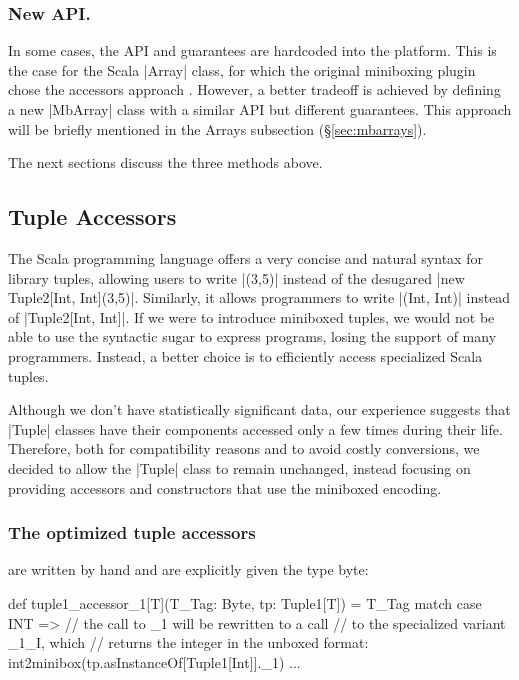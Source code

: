 \vspace{-0.5em}

\subsubsection{New API.} In some cases, the API and guarantees are hardcoded into the platform. This is the case for the Scala |Array| class, for which the original miniboxing plugin chose the accessors approach \cite{miniboxing}. However, a better tradeoff is achieved by defining a new |MbArray| class with a similar API but different guarantees. This approach will be briefly mentioned in the Arrays subsection (\S\ref{sec:mbarrays}).

The next sections discuss the three methods above.

\vspace{-0.5em}

\subsection{Tuple Accessors}
\label{sec:tuples}

\vspace{-0.25em}

The Scala programming language offers a very concise and natural syntax for library tuples, allowing users to write |(3,5)| instead of the desugared |new Tuple2[Int, Int](3,5)|. Similarly, it allows programmers to write |(Int, Int)| instead of |Tuple2[Int, Int]|. If we were to introduce miniboxed tuples, we would not be able to use the syntactic sugar to express programs, losing the support of many programmers. Instead, a better choice is to efficiently access specialized Scala tuples.

Although we don't have statistically significant data, our experience suggests that |Tuple| classes have their components accessed only a few times during their life. Therefore, both for compatibility reasons and to avoid costly conversions, we decided to allow the |Tuple| class to remain unchanged, instead focusing on providing accessors and constructors that use the miniboxed encoding.

\subsubsection{The optimized tuple accessors} are written by hand and are explicitly given the type byte:

\begin{lstlisting-nobreak}
 def tuple1_accessor_1[T](T_Tag: Byte, tp: Tuple1[T]) =
   T_Tag match {
     case INT =>
       // the call to _1 will be rewritten to a call
       // to the specialized variant _1_I, which
       // returns the integer in the unboxed format:
       int2minibox(tp.asInstanceOf[Tuple1[Int]]._1)
     ...
   }
\end{lstlisting-nobreak}


